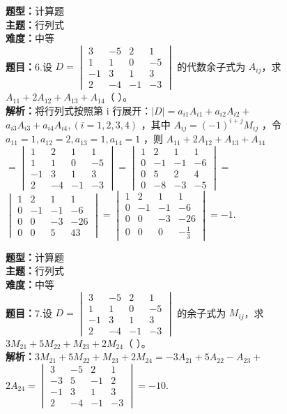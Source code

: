 \documentclass{ctexart}
\newenvironment{question}[5]{%
	\noindent\textbf{题型：}#1\\
	\textbf{主题：}#2\\
	\textbf{难度：}#3\\
	\textbf{题目：}#4\\
	\textbf{解析：}#5\\
	\vspace{1em}
}{}
\begin{document}
	\begin{question}
		{计算题}
		{行列式}
		{中等}
		{6.设 $D=\begin{vmatrix}3 & -5 & 2 & 1 \\ 1 & 1 & 0 & -5 \\ -1 & 3 & 1 & 3 \\ 2 & -4 & -1 & -3\end{vmatrix}$ 的代数余子式为 $A_{ij}$，求 $A_{11}+2 A_{12}+A_{13}+A_{14}$（ ）。}
		{将行列式按照第 i 行展开：$|D|=a_{i 1} A_{i 1}+a_{i 2} A_{i 2}+$ $a_{i 3} A_{i 3}+a_{i 4} A_{i 4},(i=1,2,3,4)$ ，其中 $A_{i j}=(-1)^{i+j} M_{i j}$ ，令 $a_{11}=1, a_{12}=2, a_{13}=1, a_{14}=1$ ，则 $A_{11}+2 A_{12}+A_{13}+A_{14}$ $=\begin{vmatrix}1 & 2 & 1 & 1 \\ 1 & 1 & 0 & -5 \\ -1 & 3 & 1 & 3 \\ 2 & -4 & -1 & -3\end{vmatrix}=\begin{vmatrix}1 & 2 & 1 & 1 \\ 0 & -1 & -1 & -6 \\ 0 & 5 & 2 & 4 \\ 0 & -8 & -3 & -5\end{vmatrix}=$
			$\begin{vmatrix}1 & 2 & 1 & 1 \\ 0 & -1 & -1 & -6 \\ 0 & 0 & -3 & -26 \\ 0 & 0 & 5 & 43\end{vmatrix}=\begin{vmatrix}1 & 2 & 1 & 1 \\ 0 & -1 & -1 & -6 \\ 0 & 0 & -3 & -26 \\ 0 & 0 & 0 & -\frac{1}{3}\end{vmatrix}=-1$.}
	\end{question}
	
	\begin{question}
		{计算题}
		{行列式}
		{中等}
		{7.设 $D=\begin{vmatrix}3 & -5 & 2 & 1 \\ 1 & 1 & 0 & -5 \\ -1 & 3 & 1 & 3 \\ 2 & -4 & -1 & -3\end{vmatrix}$ 的余子式为 $M_{ij}$，求 $3 M_{21}+5 M_{22}+M_{23}+2 M_{24}$（ ）。}
		{$3 M_{21}+5 M_{22}+M_{23}+2 M_{24}=-3 A_{21}+5 A_{22}-A_{23}+$ $2 A_{24} =\begin{vmatrix}3 & -5 & 2 & 1 \\ -3 & 5 & -1 & 2 \\ -1 & 3 & 1 & 3 \\ 2 & -4 & -1 & -3\end{vmatrix}=-10$.}
	\end{question}
	
\end{document}
